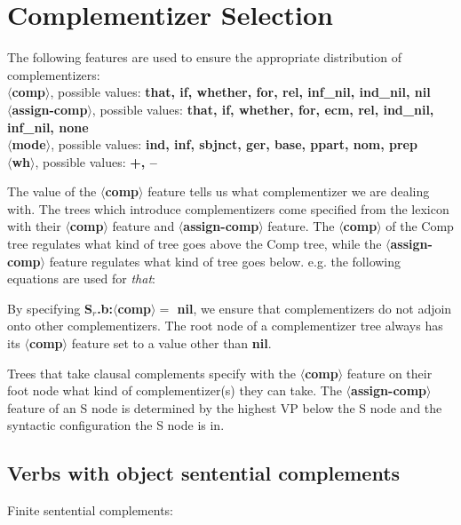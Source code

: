 \section{Complementizer Selection}
The following features are used to ensure the appropriate distribution
of complementizers:
\\
{\bf $\langle$comp$\rangle$}, possible values: {\bf that, if, whether,
for, rel, inf\_nil, ind\_nil, nil}\\
{\bf $\langle$assign-comp$\rangle$}, possible values: {\bf that, if,
whether, for, ecm, rel, ind\_nil, inf\_nil, none}\\
{\bf $\langle$mode$\rangle$}, possible values: {\bf ind, inf, sbjnct, ger, base, ppart, 
nom, prep}\\
{\bf $\langle$wh$\rangle$}, possible values: {\bf +, --}

The value of the {\bf $\langle$comp$\rangle$} feature tells us what complementizer we 
are dealing with. The trees which introduce complementizers come 
specified from the lexicon with their 
{\bf $\langle$comp$\rangle$} feature and {\bf $\langle$assign-comp$\rangle$} 
feature. The {\bf $\langle$comp$\rangle$} of the Comp tree regulates 
what kind of tree goes above the Comp tree, while the 
{\bf $\langle$assign-comp$\rangle$} feature regulates what kind of tree
goes below.
e.g.
the following equations are used for {\em that}:


By specifying {\bf S$_{r}$.b:$\langle$comp$\rangle =$ nil}, we ensure that
complementizers do not adjoin onto other complementizers. The root node
of a complementizer tree always has its {\bf $\langle$comp$\rangle$} feature
set to a value other than {\bf nil}.

Trees that take clausal complements specify with the {\bf $\langle$comp$\rangle$} feature
on their foot node what kind of complementizer(s) they can take. 
The {\bf $\langle$assign-comp$\rangle$} feature of an S node is determined 
by the highest VP below the S node and the syntactic configuration
the S node is in. 

\subsection{Verbs with object sentential complements}
Finite sentential complements:

